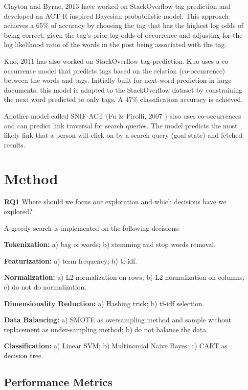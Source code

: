 \documentclass{sig-alternate-05-2015}
\begin{document}
Clayton and Byrne, 2013 \cite{stanley2013predicting} have worked on StackOverflow tag prediction and developed an ACT-R inspired Bayesian probabilistic model. This approach achieves a $65\%$ of accuracy by choosing the tag that has the highest log odds of being correct, given the tag’s prior log odds of occurrence and adjusting for the log likelihood ratio of the words in the post being associated with the tag.

Kuo, 2011 \cite{kuo2011word} has also worked on StackOverflow tag prediction. Kuo uses a co-occurrence model that predicts tags based on the relation (co-occurrence) between the words and tags. Initially built for next-word prediction in large documents, this model is adapted to the StackOverflow dataset by constraining the next word predicted to only tags. A $47\%$ classification accuracy is achieved.

Another model called SNIF-ACT (Fu \& Pirolli, 2007 \cite{fu2007snif}) also uses co-occurrences and can predict link traversal for search queries. The model predicts the most likely link that a person will click on by a search query (goal state) and fetched results. 


\section{Method}
\label{sec:Method}

\textbf{RQ1} Where should we focus our exploration and which decisions have we explored?

A greedy search is implemented on the following decisions:

\textbf{Tokenization:} a) bag of words; b) stemming and stop words removal.

\textbf{Featurization:} a) term frequency; b) tf-idf.

\textbf{Normalization:} a) L2 normalization on rows; b) L2 normalization on columns; c) do not do normalization.

\textbf{Dimensionality Reduction:} a) Hashing trick; b) tf-idf selection.

\textbf{Data Balancing:} a) SMOTE as oversampling method and sample without replacement as under-sampling method; b) do not balance the data.

\textbf{Classification:} a) Linear SVM; b) Multinomial Naive Bayes; c) CART as decision tree.

\subsection{Performance Metrics}
\end{document}
